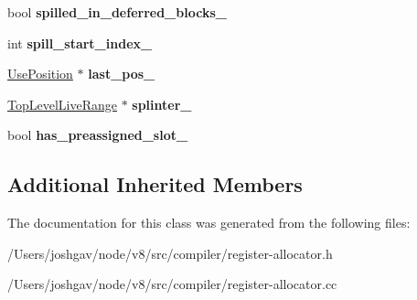\begin{DoxyCompactItemize}
\begin{tabbing}
\end{tabbing}\item 
bool {\bfseries spilled\+\_\+in\+\_\+deferred\+\_\+blocks\+\_\+}\hypertarget{classv8_1_1internal_1_1compiler_1_1_top_level_live_range_a9af33f74530670449f3ca080191fa227}{}\label{classv8_1_1internal_1_1compiler_1_1_top_level_live_range_a9af33f74530670449f3ca080191fa227}

\item 
int {\bfseries spill\+\_\+start\+\_\+index\+\_\+}\hypertarget{classv8_1_1internal_1_1compiler_1_1_top_level_live_range_a58feb46a0ae929a0a9bffc62cac0c116}{}\label{classv8_1_1internal_1_1compiler_1_1_top_level_live_range_a58feb46a0ae929a0a9bffc62cac0c116}

\item 
\hyperlink{classv8_1_1internal_1_1compiler_1_1_use_position}{Use\+Position} $\ast$ {\bfseries last\+\_\+pos\+\_\+}\hypertarget{classv8_1_1internal_1_1compiler_1_1_top_level_live_range_ae72ff23a02e431a884e0007981e375c2}{}\label{classv8_1_1internal_1_1compiler_1_1_top_level_live_range_ae72ff23a02e431a884e0007981e375c2}

\item 
\hyperlink{classv8_1_1internal_1_1compiler_1_1_top_level_live_range}{Top\+Level\+Live\+Range} $\ast$ {\bfseries splinter\+\_\+}\hypertarget{classv8_1_1internal_1_1compiler_1_1_top_level_live_range_a8796cac5e2c89c71411255a7c17ac68b}{}\label{classv8_1_1internal_1_1compiler_1_1_top_level_live_range_a8796cac5e2c89c71411255a7c17ac68b}

\item 
bool {\bfseries has\+\_\+preassigned\+\_\+slot\+\_\+}\hypertarget{classv8_1_1internal_1_1compiler_1_1_top_level_live_range_a21e4685944cd5d489f8c4d4ca0eaccba}{}\label{classv8_1_1internal_1_1compiler_1_1_top_level_live_range_a21e4685944cd5d489f8c4d4ca0eaccba}

\end{DoxyCompactItemize}
\subsection*{Additional Inherited Members}


The documentation for this class was generated from the following files\+:\begin{DoxyCompactItemize}
\item 
/\+Users/joshgav/node/v8/src/compiler/register-\/allocator.\+h\item 
/\+Users/joshgav/node/v8/src/compiler/register-\/allocator.\+cc\end{DoxyCompactItemize}

